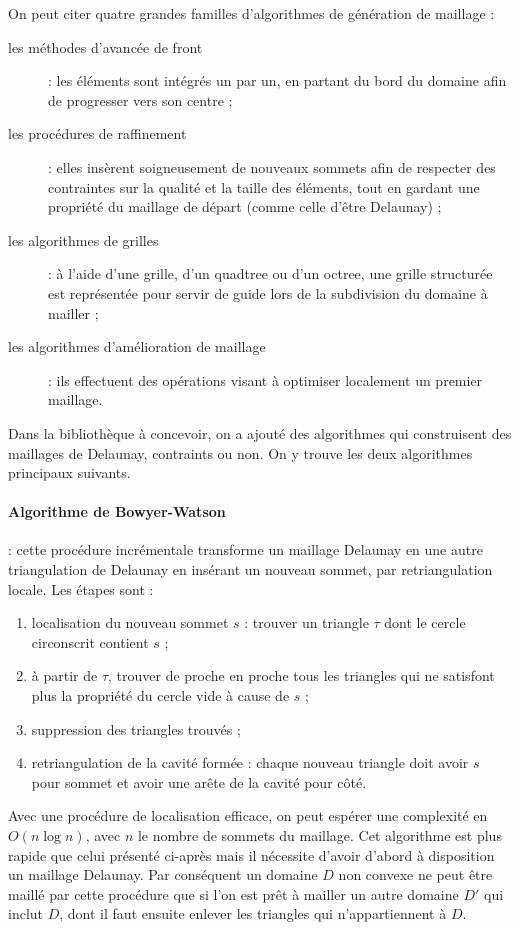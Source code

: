 \documentclass[12pt,a4paper]{report}
\begin{document}
On peut citer quatre grandes familles d'algorithmes de génération de maillage :
\begin{description}
\item[les méthodes d'avancée de front] : les éléments sont intégrés un par un, en partant du bord du domaine afin de progresser vers son centre ;
\item[les procédures de raffinement] : elles insèrent soigneusement de nouveaux sommets afin de respecter des contraintes sur la qualité et la taille des éléments, tout en gardant une propriété du maillage de départ (comme celle d'être Delaunay)  ;
\item[les algorithmes de grilles] : à l'aide d'une grille, d'un quadtree ou d'un octree, une grille structurée est représentée pour servir de guide lors de la subdivision du domaine à mailler ;
\item[les algorithmes d'amélioration de maillage] : ils effectuent des opérations visant à optimiser localement un premier maillage.
\end{description}



Dans la bibliothèque à concevoir, on a ajouté des algorithmes qui construisent des maillages de Delaunay, contraints ou non. On y trouve les deux algorithmes principaux suivants.

\paragraph{\indent Algorithme de Bowyer-Watson}\label{Bowyer-Watson} : cette procédure incrémentale transforme un maillage Delaunay en une autre triangulation de Delaunay en insérant un nouveau sommet, par retriangulation locale. Les étapes sont :
\begin{enumerate}
\item localisation du nouveau sommet $s$ : trouver un triangle $\tau$ dont le cercle circonscrit contient $s$ ;
\item à partir de $\tau$, trouver de proche en proche tous les triangles qui ne satisfont plus la propriété du cercle vide à cause de $s$ ;
\item suppression des triangles trouvés ;
\item retriangulation de la cavité formée : chaque nouveau triangle doit avoir $s$ pour sommet et avoir une arête de la cavité pour côté.
\end{enumerate}
Avec une procédure de localisation efficace, on peut espérer une complexité en $O(n\log n)$, avec $n$ le nombre de sommets du maillage. Cet algorithme est plus rapide que celui présenté ci-après mais il nécessite d'avoir d'abord à disposition un maillage Delaunay. Par conséquent un domaine $D$ non convexe ne peut être maillé par cette procédure que si l'on est prêt à mailler un autre domaine $D'$ qui inclut $D$, dont il faut ensuite enlever les triangles qui n'appartiennent à $D$.
\end{document}

